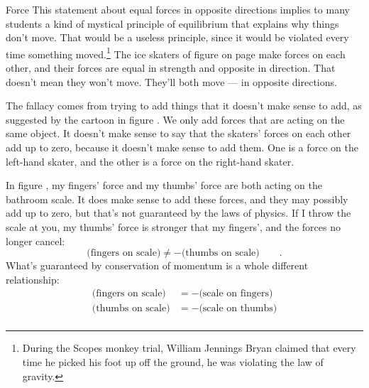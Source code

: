 \begin{envsubsection}{Force}
This statement about equal forces in opposite directions implies to many students a kind of mystical
principle of equilibrium that explains why things don't move. That would be a useless principle, since it
would be violated every time something moved.\footnote{During the Scopes monkey trial, William Jennings Bryan
claimed that every time he picked his foot up off the ground, he was violating the law of gravity.} The ice skaters
of figure  on page \pageref{fig:skatersmomentum} make forces on each
other, and their forces are equal in strength and opposite in direction. That doesn't mean
they won't move. They'll both move --- in opposite directions.

The fallacy comes from trying to
add things that it doesn't make sense to add, as suggested by the cartoon in figure .
We only add forces that are acting on the same object. It doesn't make sense to say that the skaters'
forces on each other add up to zero, because it doesn't make sense to add them. One is a force on the
left-hand skater, and the other is a force on the right-hand skater.

In figure , my fingers'
force and my thumbs' force are both acting on the bathroom scale.
It does make sense to add these forces, and they may possibly add up to zero, but
that's not guaranteed by the laws of physics. 
If I throw the scale at you, my thumbs' force is stronger that my fingers', and the forces no longer cancel:
\begin{equation*}
	\text{(fingers on scale)} \ne -\text{(thumbs on scale)} \qquad .
\end{equation*}
What's guaranteed by conservation of momentum is a whole different relationship:
\begin{align*}
	\text{(fingers on scale)} &= -\text{(scale on fingers)} \\
	\text{(thumbs on scale)} &= -\text{(scale on thumbs)} \\
\end{align*}

\end{envsubsection}
